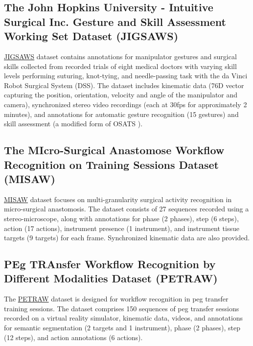 \subsection{The John Hopkins University - Intuitive Surgical Inc. Gesture and Skill Assessment Working Set Dataset (JIGSAWS)}
\href{https://cirl.lcsr.jhu.edu/research/hmm/datasets/jigsaws_release/}{JIGSAWS} dataset \citep{jigsaws} contains annotations for manipulator gestures and surgical skills collected from recorded trials of eight medical doctors with varying skill levels performing suturing, knot-tying, and needle-passing task with the da Vinci Robot Surgical System (DSS). The dataset includes kinematic data (76D vector capturing the position, orientation, velocity and angle of the manipulator and camera), synchronized stereo video recordings (each at 30fps for approximately 2 minutes), and annotations for automatic gesture recognition (15 gestures) and skill assessment (a modified form of OSATS \citep{osats}). 


\subsection{The MIcro-Surgical Anastomose Workflow Recognition on Training Sessions Dataset (MISAW)}
\href{https://www.synapse.org/#!Synapse:syn21776936/wiki/601700}{MISAW} dataset \citep{huaulme2021micro} focuses on multi-granularity surgical activity recognition in micro-surgical anastomosis. The dataset consists of 27 sequences recorded using a stereo-microscope, along with annotations for phase (2 phases), step (6 steps), action (17 actions), instrument presence (1 instrument), and instrument tissue targets (9 targets) for each frame. Synchronized kinematic data are also provided.

\subsection{PEg TRAnsfer Workflow Recognition by Different Modalities Dataset (PETRAW)}
The \href{https://www.synapse.org/#!Synapse:syn25147789/wiki/}{PETRAW} dataset \citep{huaulme2022peg} is designed for workflow recognition in peg transfer training sessions. The dataset comprises 150 sequences of peg transfer sessions recorded on a virtual reality simulator, kinematic data, videos, and annotations for semantic segmentation (2 targets and 1 instrument), phase (2 phases), step (12 steps), and action annotations (6 actions). 


